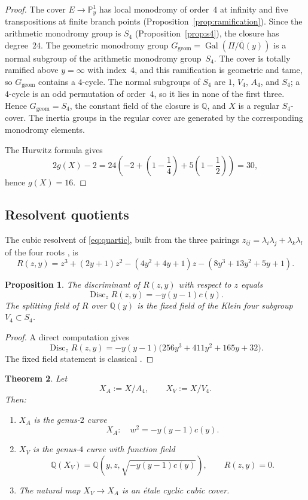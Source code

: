 \documentclass[11pt,letterpaper]{article}
\theoremstyle{plain}
\newtheorem{theorem}{Theorem}[section]
\newtheorem{proposition}[theorem]{Proposition}
\theoremstyle{remark}
\newcommand{\QQ}{\mathbb{Q}}
\newcommand{\PP}{\mathbb{P}}
\newcommand{\Disc}{\operatorname{Disc}}
\newcommand{\Gal}{\operatorname{Gal}}
\begin{document}
\begin{proof}
The cover \(E\to\PP^1_y\) has local monodromy of order~\(4\) at infinity and five transpositions at finite branch points (Proposition~\ref{prop:ramification}). Since the arithmetic monodromy group is \(S_4\) (Proposition~\ref{prop:s4}), the closure has degree~\(24\). The geometric monodromy group \(G_{\mathrm{geom}}=\Gal(\Pi/\overline{\QQ}(y))\) is a normal subgroup of the arithmetic monodromy group~\(S_4\). The cover is totally ramified above \(y=\infty\) with index~\(4\), and this ramification is geometric and tame, so \(G_{\mathrm{geom}}\) contains a \(4\)-cycle. The normal subgroups of \(S_4\) are \(1\), \(V_4\), \(A_4\), and \(S_4\); a \(4\)-cycle is an odd permutation of order~\(4\), so it lies in none of the first three. Hence \(G_{\mathrm{geom}}=S_4\), the constant field of the closure is \(\QQ\), and \(X\) is a regular \(S_4\)-cover. The inertia groups in the regular cover are generated by the corresponding monodromy elements.

The Hurwitz formula gives
\[
2g(X)-2
=24\left(-2+\left(1-\frac14\right)+5\left(1-\frac12\right)\right)
=30,
\]
hence \(g(X)=16\).
\end{proof}

\subsection{Resolvent quotients}

The cubic resolvent of \eqref{eq:quartic}, built from the three pairings \(z_{ij}=\lambda_i\lambda_j+\lambda_k\lambda_l\) of the four roots \cite{Cox2012}, is
\begin{equation}\label{eq:resolvent}
R(z,y)=z^3+(2y+1)z^2-(4y^2+4y+1)z-(8y^3+13y^2+5y+1).
\end{equation}

\begin{proposition}\label{prop:resolvent}
The discriminant of \(R(z,y)\) with respect to \(z\) equals
\[
\Disc_z R(z,y)=-y(y-1)c(y).
\]
The splitting field of \(R\) over \(\QQ(y)\) is the fixed field of the Klein four subgroup \(V_4\subset S_4\).
\end{proposition}

\begin{proof}
A direct computation gives
\[
\Disc_z R(z,y)=-y(y-1)\bigl(256y^3+411y^2+165y+32\bigr).
\]
The fixed field statement is classical \cite{Cox2012}.
\end{proof}

\begin{theorem}\label{thm:quotients}
Let
\[
X_A:=X/A_4,\qquad X_V:=X/V_4.
\]
Then:
\begin{enumerate}
\item[(i)] \(X_A\) is the genus-\(2\) curve
\[
X_A:\quad w^2=-y(y-1)c(y).
\]
\item[(ii)] \(X_V\) is the genus-\(4\) curve with function field
\[
\QQ(X_V)=\QQ(y,z,\sqrt{-y(y-1)c(y)}),\qquad R(z,y)=0.
\]
\item[(iii)] The natural map \(X_V\to X_A\) is an \'etale cyclic cubic cover.
\end{enumerate}
\end{theorem}
\end{document}
